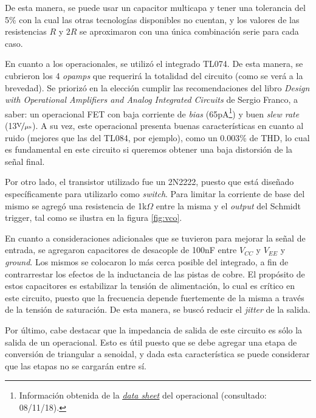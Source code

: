 \documentclass[../../tc_tp6_main.tex]{subfiles}
\begin{document}
De esta manera, se puede usar un capacitor multicapa y tener una tolerancia del 5\% con la cual las otras tecnolog\'ias disponibles no cuentan, y los valores de las resistencias $R$ y $2R$ se aproximaron con una \'unica combinaci\'on serie para cada caso.\par

En cuanto a los operacionales, se utiliz\'o el integrado TL074. De esta manera, se cubrieron los 4 \textit{opamps} que requerir\'a la totalidad del circuito (como se ver\'a a la brevedad). Se prioriz\'o en la elecci\'on cumplir las recomendaciones del libro \textit{Design with Operational Amplifiers and Analog Integrated Circuits} de Sergio Franco, a saber: un operacional FET con baja corriente de \textit{bias} (65pA\footnote{Informaci\'on obtenida de la \href{http://www.ti.com/lit/ds/symlink/tl074.pdf}{\underline{\textit{data sheet}}} del operacional (consultado: 08/11/18).}) y buen \textit{slew rate} (13$\nicefrac{\mathrm{V}}{\mu\mathrm{s}}$). A su vez, este operacional presenta buenas caracter\'isticas en cuanto al ruido (mejores que las del TL084, por ejemplo), como un 0.003\% de THD, lo cual es fundamental en este circuito si queremos obtener una baja distorsi\'on de la se\~nal final.\par 

Por otro lado, el transistor utilizado fue un 2N2222, puesto que est\'a dise\~nado espec\'ificamente para utilizarlo como \textit{switch}. Para limitar la corriente de base del mismo se agreg\'o una resistencia de 1k$\Omega$ entre la misma y el \textit{output} del Schmidt trigger, tal como se ilustra en la figura \ref{fig:vco}. \par

En cuanto a consideraciones adicionales que se tuvieron para mejorar la se\~nal de entrada, se agregaron capacitores de desacople de 100nF entre $V_{CC}$ y $V_{EE}$ y \textit{ground}. Los mismos se colocaron lo m\'as cerca posible del integrado, a fin de contrarrestar los efectos de la inductancia de las pistas de cobre. El prop\'osito de estos capacitores es estabilizar la tensi\'on de alimentaci\'on, lo cual es cr\'itico en este circuito, puesto que la frecuencia depende fuertemente de la misma a trav\'es de la tensi\'on de saturaci\'on. De esta manera, se busc\'o reducir el \textit{jitter} de la salida.\par

Por \'ultimo, cabe destacar que la impedancia de salida de este circuito es s\'olo la salida de un operacional. Esto es \'util puesto que se debe agregar una etapa de conversi\'on de triangular a senoidal, y dada esta caracter\'istica se puede considerar que las etapas no se cargar\'an entre s\'i. 
\end{document}
